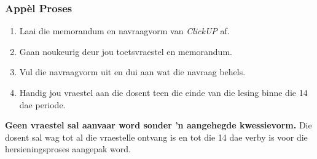     \subsubsection{App\`{e}l Proses}
        \begin{enumerate}
            \item Laai die memorandum en navraagvorm van \textit{ClickUP} af.
            \item Gaan noukeurig deur jou toetsvraestel en memorandum.
            \item Vul die navraagvorm uit en dui aan wat die navraag behels.
            \item Handig jou vraestel aan die dosent teen die einde van die
                lesing binne die 14 dae periode.
        \end{enumerate}

        \textbf{Geen vraestel sal aanvaar word sonder 'n aangehegde
        kwessievorm.}  Die dosent sal wag tot al die vraestelle ontvang is en
        tot die 14 dae verby is voor die hersieningsproses aangepak word.
